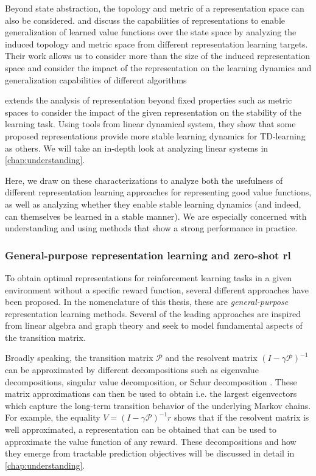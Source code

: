 Beyond state abstraction, the topology and metric of a representation space can also be considered. 
\textcite{le2021metrics} and \textcite{lelan2022generalization} discuss the capabilities of representations to enable generalization of learned value functions over the state space by analyzing the induced topology and metric space from different representation learning targets.
Their work allows us to consider more than the size of the induced representation space and consider the impact of the representation on the learning dynamics and generalization capabilities of different algorithms

\textcite{ghosh2020representations} extends the analysis of representation beyond fixed properties such as metric spaces to consider the impact of the given representation on the stability of the learning task.
Using tools from linear dynamical system, they show that some proposed representations provide more stable learning dynamics for TD-learning as others.
We will take an in-depth look at analyzing linear systems in \autoref{chap:understanding}.

Here, we draw on these characterizations to analyze both the usefulness of different representation learning approaches for representing good value functions, as well as analyzing whether they enable stable learning dynamics (and indeed, can themselves be learned in a stable manner).
We are especially concerned with understanding and using methods that show a strong performance in practice.

\subsubsection{General-purpose representation learning and zero-shot \ac{rl}}

To obtain optimal representations for reinforcement learning tasks in a given environment without a specific reward function, several different approaches have been proposed.
In the nomenclature of this thesis, these are \emph{general-purpose} representation learning methods.
Several of the leading approaches are inspired from linear algebra and graph theory and seek to model fundamental aspects of the transition matrix.

Broadly speaking, the transition matrix $\mathcal{P}$ and the resolvent matrix $(I - \gamma \mathcal{P})^{-1}$ can be approximated by different decompositions such as eigenvalue decompositions, singular value decomposition, or Schur decomposition \parencite{ghosh2020representations}.
These matrix approximations can then be used to obtain i.e. the largest eigenvectors which capture the long-term transition behavior of the underlying Markov chains.
For example, the equality $V = (I - \gamma \mathcal{P})^{-1} r$ shows that if the resolvent matrix is well approximated, a representation can be obtained that can be used to approximate the value function of any reward.
These decompositions and how they emerge from tractable prediction objectives will be discussed in detail in \autoref{chap:understanding}.

